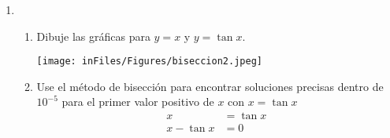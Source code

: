 \documentclass[12pt]{article}
\begin{document}
\begin{enumerate}
\begin{enumerate}[label=\alph*]
    \end{enumerate}
    
    \item \begin{enumerate}[label=\alph*]
        \item Dibuje las gráficas para \( y = x\) y \( y = \tan x\). 
        
        \begin{center}
            \texttt{[image: inFiles/Figures/biseccion2.jpeg]}     
        \end{center}
        \item Use el método de bisección para encontrar soluciones precisas dentro de \(10^{-5}\) para el primer valor positivo de \( x \) con \( x = \tan x\) 
        \[
        \begin{aligned}
            x &= \tan x\\
            x - \tan x &= 0    
        \end{aligned}
        \]


\end{enumerate}
\end{enumerate}
\end{document}
